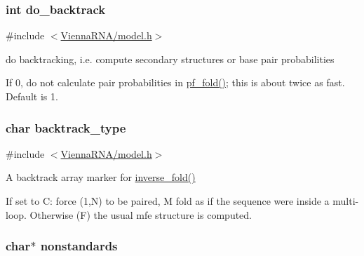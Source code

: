 \subsubsection[{do\+\_\+backtrack}]{\setlength{\rightskip}{0pt plus 5cm}int do\+\_\+backtrack}\label{group__model__details_gad512b5dd4dbec60faccfe137bb474489}


{\ttfamily \#include $<$\hyperlink{model_8h}{Vienna\+R\+N\+A/model.\+h}$>$}



do backtracking, i.\+e. compute secondary structures or base pair probabilities 

If 0, do not calculate pair probabilities in \hyperlink{group__pf__fold_gadc3db3d98742427e7001a7fd36ef28c2}{pf\+\_\+fold()}; this is about twice as fast. Default is 1. \hypertarget{group__model__details_ga83bdb43472a259c71e69fa9f70f420c3}{}
\subsubsection[{backtrack\+\_\+type}]{\setlength{\rightskip}{0pt plus 5cm}char backtrack\+\_\+type}\label{group__model__details_ga83bdb43472a259c71e69fa9f70f420c3}


{\ttfamily \#include $<$\hyperlink{model_8h}{Vienna\+R\+N\+A/model.\+h}$>$}



A backtrack array marker for \hyperlink{group__inverse__fold_ga7af026de55d4babad879f2c92559cbbc}{inverse\+\_\+fold()} 

If set to \textquotesingle{}C\textquotesingle{}\+: force (1,N) to be paired, \textquotesingle{}M\textquotesingle{} fold as if the sequence were inside a multi-\/loop. Otherwise (\textquotesingle{}F\textquotesingle{}) the usual mfe structure is computed. \hypertarget{group__model__details_ga2695d91cc535d09c2eae5c3884e2ec64}{}
\subsubsection[{nonstandards}]{\setlength{\rightskip}{0pt plus 5cm}char$\ast$ nonstandards}\label{group__model__details_ga2695d91cc535d09c2eae5c3884e2ec64}


